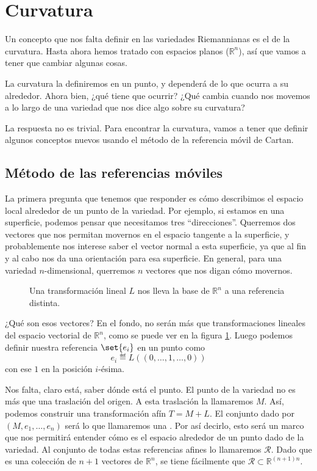\section{Curvatura}

Un concepto que nos falta definir en las variedades Riemannianas es el de la curvatura. Hasta ahora hemos tratado con espacios planos ($ℝ^n$), así que vamos a tener que cambiar algunas cosas.

La curvatura la definiremos en un punto, y dependerá de lo que ocurra a su alrededor. Ahora bien, ¿qué tiene que ocurrir? ¿Qué cambia cuando nos movemos a lo largo de una variedad que nos dice algo sobre su curvatura?

La respuesta no es trivial. Para encontrar la curvatura, vamos a tener que definir algunos conceptos nuevos usando el método de la referencia móvil de Cartan.

\subsection{Método de las referencias móviles}

La primera pregunta que tenemos que responder es cómo describimos el espacio local alrededor de un punto de la variedad. Por ejemplo, si estamos en una superficie, podemos pensar que necesitamos tres ``direcciones''. Querremos dos vectores que nos permitan movernos en el espacio tangente a la superficie, y probablemente nos interese saber el vector normal a esta superficie, ya que al fin y al cabo nos da una orientación para esa superficie. En general, para una variedad $n$-dimensional, querremos $n$ vectores que nos digan cómo movernos.

\begin{figure}[hbtp]
\centering
{}
\caption{Una transformación lineal $L$ nos lleva la base de $ℝ^n$ a una referencia distinta.}
\label{figReferencia}
\end{figure}

¿Qué son esos vectores? En el fondo, no serán más que transformaciones lineales del espacio vectorial de $ℝ^n$, como se puede ver en la figura \ref{figReferencia}. Luego podemos definir nuestra referencia $\set{e_i}$ en un punto como \[ e_i ≝ L\left((0,\dotsc,1,\dotsc,0)\right) \] con ese $1$ en la posición $i$-ésima.

Nos falta, claro está, saber dónde está el punto. El punto de la variedad no es más que una traslación del origen. A esta traslación la llamaremos $M$. Así, podemos construir una transformación afín $T = M + L$. El conjunto dado por $(M, e_1, \dotsc, e_n)$ será lo que llamaremos una . Por así decirlo, esto será un marco que nos permitirá entender cómo es el espacio alrededor de un punto dado de la variedad. Al conjunto de todas estas referencias afines lo llamaremos $\mathcal{R}$. Dado que es una colección de $n+1$ vectores de $ℝ^n$, se tiene fácilmente que $\mathcal{R} ⊂ ℝ^{(n+1)n}$.

